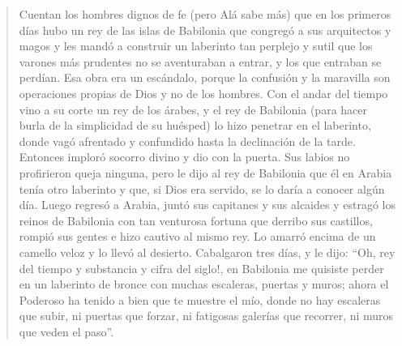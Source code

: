 \begin{quote}
\forceindent{} \label{borges}

Cuentan los hombres dignos de fe (pero Alá sabe más) que en los primeros
días hubo un rey de las islas de Babilonia que congregó a sus
arquitectos y magos y les mandó a construir un laberinto tan perplejo y
sutil que los varones más prudentes no se aventuraban a entrar, y los
que entraban se perdían. Esa obra era un escándalo, porque la confusión
y la maravilla son operaciones propias de Dios y no de los hombres. Con
el andar del tiempo vino a su corte un rey de los árabes, y el rey de
Babilonia (para hacer burla de la simplicidad de su huésped) lo hizo
penetrar en el laberinto, donde vagó afrentado y confundido hasta la
declinación de la tarde. Entonces imploró socorro divino y dio con la
puerta. Sus labios no profirieron queja ninguna, pero le dijo al rey de
Babilonia que él en Arabia tenía otro laberinto y que, si Dios era
servido, se lo daría a conocer algún día. Luego regresó a Arabia, juntó
sus capitanes y sus alcaides y estragó los reinos de Babilonia con tan
venturosa fortuna que derribo sus castillos, rompió sus gentes e hizo
cautivo al mismo rey. Lo amarró encima de un camello veloz y lo llevó al
desierto. Cabalgaron tres días, y le dijo: ``Oh, rey del tiempo y
substancia y cifra del siglo!, en Babilonia me quisiste perder en un
laberinto de bronce con muchas escaleras, puertas y muros; ahora el
Poderoso ha tenido a bien que te muestre el mío, donde no hay escaleras
que subir, ni puertas que forzar, ni fatigosas galerías que recorrer, ni
muros que veden el paso''.


\end{quote}
